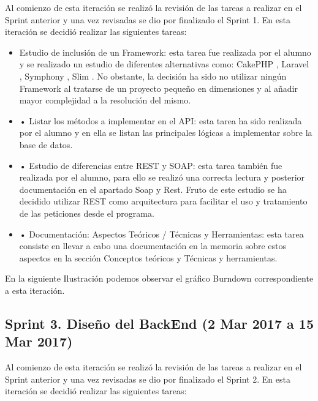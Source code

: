 Al comienzo de esta iteración se realizó la revisión de las tareas a realizar en el Sprint anterior y una vez revisadas se dio por finalizado el Sprint 1. 
En esta iteración se decidió realizar las siguientes tareas:

\begin{itemize}
	
	\item Estudio de inclusión de un Framework: esta tarea fue realizada por el alumno y se realizado un estudio de diferentes alternativas como: CakePHP \cite{wiki:cakephp}, Laravel \cite{wiki:laravel}, Symphony \cite{wiki:symphony}, Slim \cite{wiki:slim}. No obstante, la decisión ha sido no utilizar ningún Framework al tratarse de un proyecto pequeño en dimensiones y al añadir mayor complejidad a la resolución del mismo.
	
	\item •	Listar los métodos a implementar en el API: esta tarea ha sido realizada por el alumno y en ella se listan las principales lógicas a implementar sobre la base de datos.
	
	\item •	Estudio de diferencias entre REST y SOAP: esta tarea también fue realizada por el alumno, para ello se realizó una correcta lectura y posterior documentación en el apartado Soap y Rest. Fruto de este estudio se ha decidido utilizar REST como arquitectura para facilitar el uso y tratamiento de las peticiones desde el programa.
	
	\item •	Documentación: Aspectos Teóricos / Técnicas y Herramientas: esta tarea consiste en llevar a cabo una documentación en la memoria sobre estos aspectos en la sección Conceptos teóricos y Técnicas y herramientas.


\end{itemize}

En la siguiente Ilustración podemos observar el gráfico Burndown correspondiente a esta iteración.


\subsection{Sprint 3. Diseño del BackEnd (2 Mar 2017 a 15 Mar 2017)}

Al comienzo de esta iteración se realizó la revisión de las tareas a realizar en el Sprint anterior y una vez revisadas se dio por finalizado el Sprint 2. 
En esta iteración se decidió realizar las siguientes tareas:

